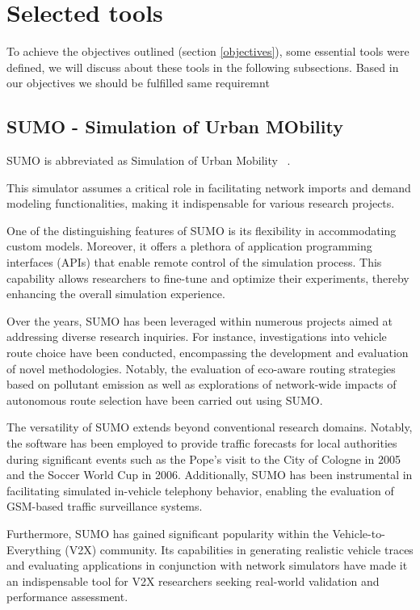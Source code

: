 \documentclass[
  oneside,
  11pt, a4paper,
  footinclude=true,
  headinclude=true,
  cleardoublepage=empty
]{scrbook}
\begin{document}
\section{Selected tools}
\label{tools}

To achieve the objectives outlined (section \ref{objectives}), some essential tools were defined, we will discuss about these tools in the following subsections.
Based in our objectives we should be fulfilled same requiremnt

\subsection{SUMO - Simulation of Urban MObility}
\label{SUMO}

SUMO is abbreviated as Simulation of Urban Mobility ~\cite{dlr127994}. 

This simulator assumes a critical role in facilitating network imports and demand modeling functionalities, making it indispensable for various research projects.

One of the distinguishing features of SUMO is its flexibility in accommodating custom models. Moreover, it offers a plethora of application programming interfaces (APIs) that enable remote control of the simulation process. This capability allows researchers to fine-tune and optimize their experiments, thereby enhancing the overall simulation experience.

Over the years, SUMO has been leveraged within numerous projects aimed at addressing diverse research inquiries. For instance, investigations into vehicle route choice have been conducted, encompassing the development and evaluation of novel methodologies. Notably, the evaluation of eco-aware routing strategies based on pollutant emission as well as explorations of network-wide impacts of autonomous route selection have been carried out using SUMO.

The versatility of SUMO extends beyond conventional research domains. Notably, the software has been employed to provide traffic forecasts for local authorities during significant events such as the Pope's visit to the City of Cologne in 2005 and the Soccer World Cup in 2006. Additionally, SUMO has been instrumental in facilitating simulated in-vehicle telephony behavior, enabling the evaluation of GSM-based traffic surveillance systems.

Furthermore, SUMO has gained significant popularity within the Vehicle-to-Everything (V2X) community. Its capabilities in generating realistic vehicle traces and evaluating applications in conjunction with network simulators have made it an indispensable tool for V2X researchers seeking real-world validation and performance assessment.
\end{document}
